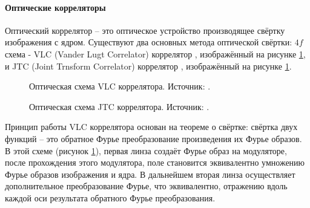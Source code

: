 \paragraph{Оптические корреляторы}
Оптический коррелятор -- это оптическое устройство производящее свёртку изображения с ядром. Существуют два основных метода оптической свёртки: $4f$ схема - VLC (Vander Lugt Correlator) коррелятор \cite{lugt1964signal}, изображённый на рисунке \ref{ris:VLC}, и JTC (Joint Trnsform Correlator) коррелятор \cite{weaver1966technique}, изображённый на рисунке \ref{ris:VLC}.
\begin{figure}[htbp]
	\caption{Оптическая схема VLC коррелятора. Источник: \cite{goncharov2019features}.}
	\label{ris:VLC}
\end{figure}
\begin{figure}[htbp]
	\caption{Оптическая схема JTC коррелятора. Источник: \cite{alfalou2009optical}.}
	\label{ris:JTC}
\end{figure}
Принцип работы VLC коррелятора основан на теореме о свёртке: свёртка двух функций -- это обратное Фурье преобразование произведения их Фурье образов. В этой схеме (рисунок \ref{ris:VLC}), первая линза создаёт Фурье образ \cite{goodman2005introduction} на модуляторе, после прохождения этого модулятора, поле становится эквивалентно умножению Фурье образов изображения и ядра. В дальнейшем вторая линза осуществляет дополнительное преобразование Фурье, что эквивалентно, отражению вдоль каждой оси результата обратного Фурье преобразования.
